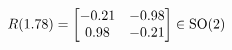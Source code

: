 \documentclass[preview]{standalone}
\begin{document}
\begin{align*}
\special{dvisvgm:raw <g id='unique000'>}R(1.78) = \begin{bmatrix} -0.21 & -0.98 \\ 0.98 & -0.21 \end{bmatrix} \in \text{SO}(2)\special{dvisvgm:raw </g>}
\end{align*}
\end{document}
